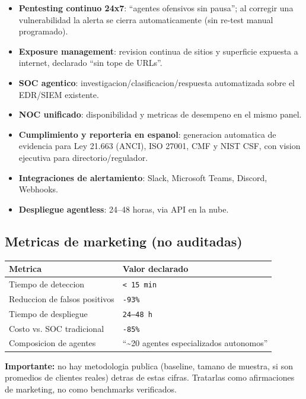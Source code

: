 \documentclass[11pt,a4paper]{article}
\begin{document}
\begin{itemize}[leftmargin=1.4em]
  \item \textbf{Pentesting continuo 24x7}: ``agentes ofensivos sin pausa''; al corregir una
  vulnerabilidad la alerta se cierra automaticamente (sin re-test manual programado).
  \item \textbf{Exposure management}: revision continua de sitios y superficie expuesta a
  internet, declarado ``sin tope de URLs''.
  \item \textbf{SOC agentico}: investigacion/clasificacion/respuesta automatizada sobre el
  EDR/SIEM existente.
  \item \textbf{NOC unificado}: disponibilidad y metricas de desempeno en el mismo panel.
  \item \textbf{Cumplimiento y reporteria en espanol}: generacion automatica de evidencia para
  Ley 21.663 (ANCI), ISO 27001, CMF y NIST CSF, con vision ejecutiva para directorio/regulador.
  \item \textbf{Integraciones de alertamiento}: Slack, Microsoft Teams, Discord, Webhooks.
  \item \textbf{Despliegue agentless}: 24--48 horas, via API en la nube.
\end{itemize}

\subsection{Metricas de marketing (no auditadas)}

\begin{longtable}{L{6cm}L{8cm}}
\toprule
\textbf{Metrica} & \textbf{Valor declarado} \\
\midrule
\endhead
Tiempo de deteccion & \texttt{< 15 min} \\
Reduccion de falsos positivos & \texttt{-93\%} \\
Tiempo de despliegue & \texttt{24--48 h} \\
Costo vs. SOC tradicional & \texttt{-85\%} \\
Composicion de agentes & ``\textasciitilde 20 agentes especializados autonomos'' \\
\bottomrule
\end{longtable}

\textbf{Importante:} no hay metodologia publica (baseline, tamano de muestra, si son promedios
de clientes reales) detras de estas cifras. Tratarlas como afirmaciones de marketing, no como
benchmarks verificados.

\end{document}
